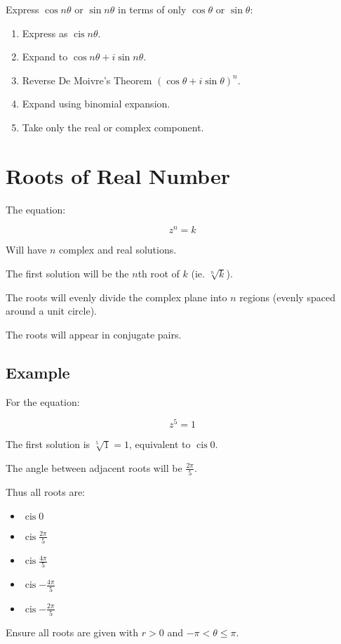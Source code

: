 \documentclass[a4paper,11pt]{report}
\DeclareMathOperator\cis{cis}
\begin{document}
Express $\cos{n \theta}$ or $\sin{n \theta}$ in terms of only $\cos{\theta}$ or
$\sin{\theta}$:

\begin{enumerate}
\item Express as $\cis{n \theta}$.
\item Expand to $\cos{n \theta} + i \sin{n \theta}$.
\item Reverse De Moivre's Theorem $(\cos{\theta} + i \sin{\theta})^n$.
\item Expand using binomial expansion.
\item Take only the real or complex component.
\end{enumerate}


\section{Roots of Real Number}

The equation:

$$
z^n = k
$$

Will have $n$ complex and real solutions.

The first solution will be the $n$th root of $k$ (ie. $\sqrt[n]{k}$).

The roots will evenly divide the complex plane into $n$ regions (evenly spaced
around a unit circle).

The roots will appear in conjugate pairs.

\subsection{Example}

For the equation:

$$
z^5 = 1
$$

The first solution is $\sqrt[5]{1} = 1$, equivalent to $\cis{0}$.

The angle between adjacent roots will be $\frac{2\pi}{5}$.

Thus all roots are:

\begin{itemize}
\item $\cis{0}$
\item $\cis{\frac{2\pi}{5}}$
\item $\cis{\frac{4\pi}{5}}$
\item $\cis{-\frac{4\pi}{5}}$
\item $\cis{-\frac{2\pi}{5}}$
\end{itemize}

Ensure all roots are given with $r > 0$ and $-\pi < \theta \leq \pi$.
\end{document}
